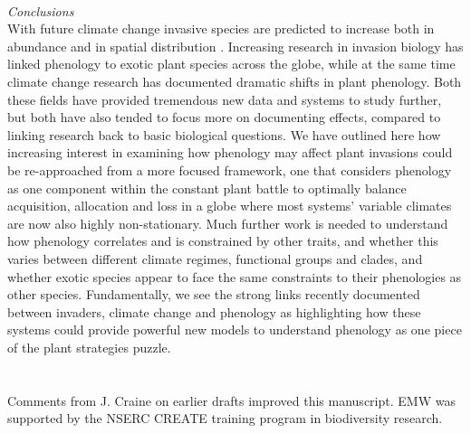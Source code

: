 \documentclass[11pt,a4paper,oneside]{article}
\begin{document}
 \\
\noindent \emph{Conclusions}\\
With future climate change invasive species are predicted to increase both in abundance and in spatial distribution \citep{Team:2007hk,bradley2010}. Increasing research in invasion biology has linked phenology to exotic plant species across the globe, while at the same time climate change research has documented dramatic shifts in plant phenology. Both these fields have provided tremendous new data and systems to study further, but both have also tended to focus more on documenting effects, compared to linking research back to basic biological questions. We have outlined here how increasing interest in examining how phenology may affect plant invasions could be re-approached from a more focused framework, one that considers phenology as one component within the constant plant battle to optimally balance acquisition, allocation and loss in a globe where most systems' variable climates are now also highly non-stationary. Much further work is needed to understand how phenology correlates and is constrained by other traits, and whether this varies between different climate regimes, functional groups and clades, and whether exotic species appear to face the same constraints to their phenologies as other species. Fundamentally, we see the strong links recently documented between invaders, climate change and phenology as highlighting how these systems could provide powerful new models to understand phenology as one piece of the plant strategies puzzle. \\
\\
\\
Comments from J. Craine on earlier drafts improved this manuscript. EMW was supported by the NSERC CREATE training program in biodiversity research.  

\newpage

\end{document}
